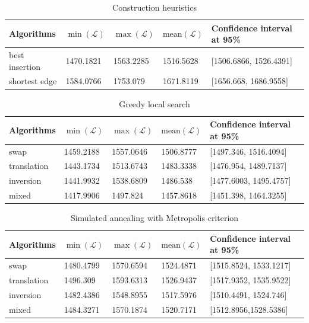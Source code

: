 \documentclass[a4paper, 11pt]{scrartcl}
\begin{document}
\begin{table}[h]
\centering
\caption{Construction heuristics}
\label{table:construction-heuristics}
\begin{tabular}{@{}lllll@{}}
\toprule
Algorithms     & $\min(\mathcal{L})$ & $\max(\mathcal{L})$ & $\mathrm{mean}(\mathcal{L})$ & Confidence interval at 95\% \\ \midrule
best insertion & 1470.1821           & 1563.2285           & 1516.5628                    & {[}1506.6866, 1526.4391{]}  \\
shortest edge  & 1584.0766           & 1753.079            & 1671.8119                    & {[}1656.668, 1686.9558{]}   \\ \bottomrule
\end{tabular}
\end{table}


\begin{table}[h]
\centering
\caption{Greedy local search}
\label{table:greedy-local-search}
\begin{tabular}{@{}lllll@{}}
\toprule
Algorithms  & $\min(\mathcal{L})$ & $\max(\mathcal{L})$ & $\mathrm{mean}(\mathcal{L})$ & Confidence interval at 95\% \\ \midrule
swap        & 1459.2188           & 1557.0646           & 1506.8777                    & [1497.346, 1516.4094]  \\
translation & 1443.1734           & 1513.6743           & 1483.3338                    & [1476.954, 1489.7137]   \\
inversion   & 1441.9932           & 1538.6809           & 1486.538                     & [1477.6003, 1495.4757]  \\
mixed       & 1417.9906           & 1497.824            & 1457.8618                    & [1451.398, 1464.3255]   \\ \bottomrule
\end{tabular}
\end{table}


\begin{table}[h]
\centering
\caption{Simulated annealing with Metropolis criterion}
\label{table:simulated-annealing-metropolis}
\begin{tabular}{@{}lllll@{}}
\toprule
Algorithms  & $\min(\mathcal{L})$ & $\max(\mathcal{L})$ & $\mathrm{mean}(\mathcal{L})$ & Confidence interval at 95\% \\ \midrule
swap        & 1480.4799           & 1570.6594           & 1524.4871                    & [1515.8524, 1533.1217]  \\
translation & 1496.309            & 1593.6313           & 1526.9437                    & [1517.9352, 1535.9522]   \\
inversion   & 1482.4386           & 1548.8955           & 1517.5976                    & [1510.4491, 1524.746]  \\
mixed       & 1484.3271           & 1570.1874           & 1520.7171                    & [1512.8956,1528.5386]  \\ \bottomrule
\end{tabular}
\end{table}
\end{document}
